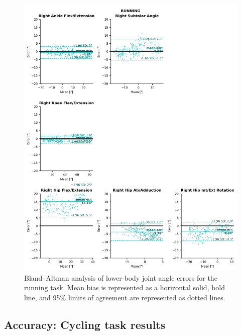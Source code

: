 \begin{figure}[!ht]
	\centering
	\def\svgwidth{1\columnwidth}
	\fontsize{10pt}{10pt}\selectfont
	\includegraphics[height=\dimexpr\textheight-119pt]{"../Annexes/Figures/Fig_BlandRun.png"}
	\caption{Bland–Altman analysis of lower-body joint angle errors for the running task. Mean bias is represented as a horizontal solid, bold line, and 95\% limits of agreement are represented as dotted lines.}
	\label{fig_blandrun}
\end{figure}


\clearpage
\subsection{Accuracy: Cycling task results}

